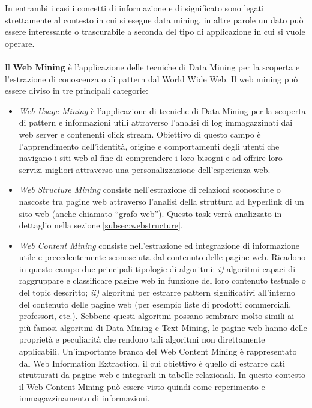 In entrambi i casi i concetti di informazione e di significato sono legati strettamente al contesto in cui si esegue data mining, in altre parole un dato può essere interessante o trascurabile a seconda del tipo di applicazione in cui si vuole operare.
\\\\
Il \textbf{Web Mining} è l’applicazione delle tecniche di Data Mining per la scoperta e l’estrazione di conoscenza o di pattern dal World Wide Web.
Il web mining può essere diviso in tre principali categorie:
\begin{itemize}
\item \textit{Web Usage Mining} è l’applicazione di tecniche di Data Mining per la scoperta di pattern e informazioni utili attraverso l'analisi di log immagazzinati dai web server e contenenti click stream. 
Obiettivo di questo campo è l'apprendimento dell'identità, origine e comportamenti degli utenti che navigano i siti web al fine di comprendere i loro bisogni e ad offrire loro servizi migliori attraverso una personalizzazione dell'esperienza web.
\item \textit{Web Structure Mining} consiste nell'estrazione di relazioni sconosciute o nascoste tra pagine web attraverso l'analisi della struttura ad hyperlink di un sito web (anche chiamato ``grafo web''). Questo task verrà analizzato in dettaglio nella sezione \ref{subsec:webstructure}.
\item \textit{Web Content Mining} consiste nell'estrazione ed integrazione di informazione utile e precedentemente sconosciuta dal contenuto delle pagine web. Ricadono in questo campo due principali tipologie di algoritmi: \textit{i)} algoritmi capaci di raggruppare e classificare pagine web in funzione del loro contenuto testuale o del topic descritto; \textit{ii)} algoritmi per estrarre pattern significativi all'interno del contenuto delle pagine web (per esempio liste di prodotti commerciali, professori, etc.).  
Sebbene questi algoritmi possano sembrare molto simili ai più famosi algoritmi di Data Mining e Text Mining, le pagine web hanno delle proprietà e peculiarità che rendono tali algoritmi non direttamente applicabili. Un'importante branca del Web Content Mining è rappresentato dal Web Information Extraction, il cui obiettivo è quello di estrarre dati strutturati da pagine web e integrarli in tabelle relazionali. In questo contesto il Web Content Mining può essere visto quindi come reperimento e immagazzinamento di informazioni.
\end{itemize}

